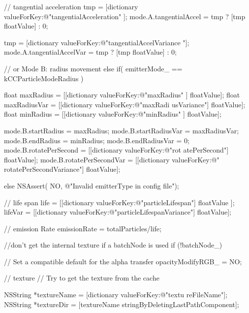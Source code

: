 \begin{DoxyCode}
{{{                        // tangential acceleration
                        tmp = [dictionary valueForKey:@"tangentialAcceleration"
      ];
                        mode.A.tangentialAccel = tmp ? [tmp floatValue] : 0;

                        tmp = [dictionary valueForKey:@"tangentialAccelVariance
      "];
                        mode.A.tangentialAccelVar = tmp ? [tmp floatValue] : 0;
                }

                // or Mode B: radius movement
                else if( emitterMode_ == kCCParticleModeRadius ) {
                        float maxRadius = [[dictionary valueForKey:@"maxRadius"
      ] floatValue];
                        float maxRadiusVar = [[dictionary valueForKey:@"maxRadi
      usVariance"] floatValue];
                        float minRadius = [[dictionary valueForKey:@"minRadius"
      ] floatValue];

                        mode.B.startRadius = maxRadius;
                        mode.B.startRadiusVar = maxRadiusVar;
                        mode.B.endRadius = minRadius;
                        mode.B.endRadiusVar = 0;
                        mode.B.rotatePerSecond = [[dictionary valueForKey:@"rot
      atePerSecond"] floatValue];
                        mode.B.rotatePerSecondVar = [[dictionary valueForKey:@"
      rotatePerSecondVariance"] floatValue];

                } else {
                        NSAssert( NO, @"Invalid emitterType in config file");
                }

                // life span
                life = [[dictionary valueForKey:@"particleLifespan"] floatValue
      ];
                lifeVar = [[dictionary valueForKey:@"particleLifespanVariance"]
       floatValue];

                // emission Rate
                emissionRate = totalParticles/life;

                //don't get the internal texture if a batchNode is used
                if (!batchNode_)
                {
                        // Set a compatible default for the alpha transfer
                        opacityModifyRGB_ = NO;

                        // texture
                        // Try to get the texture from the cache

                        NSString *textureName = [dictionary valueForKey:@"textu
      reFileName"];
                        NSString *textureDir = [textureName 
      stringByDeletingLastPathComponent];
                        
}}}
\end{DoxyCode}
